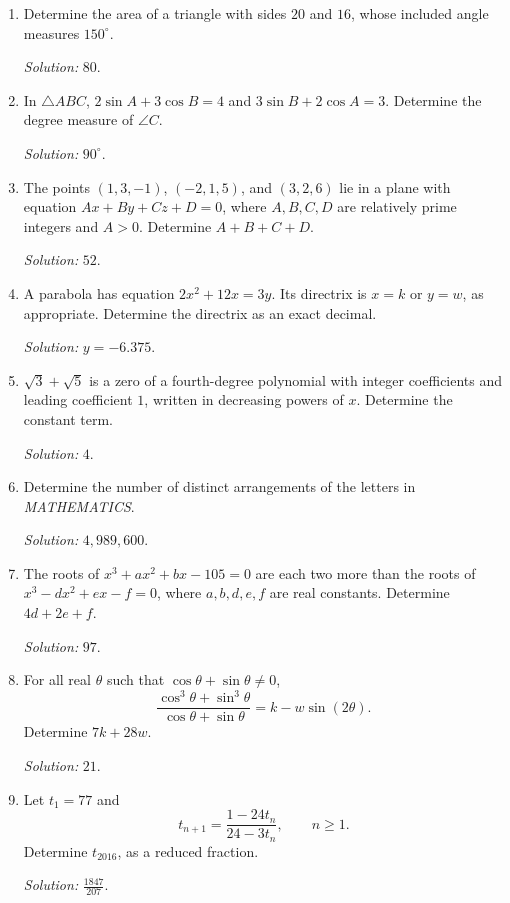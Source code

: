 \documentclass[11pt]{article}
\begin{document}
\begin{enumerate}[label=\textbf{\arabic*.}]
\item Determine the area of a triangle with sides $20$ and $16$, whose included angle measures $150^\circ$.\par\textit{Solution: }$80$.

\item In $\triangle ABC$, $2\sin A+3\cos B=4$ and $3\sin B+2\cos A=3$. Determine the degree measure of $\angle C$.\par\textit{Solution: }$90^\circ$.

\item The points $(1,3,-1)$, $(-2,1,5)$, and $(3,2,6)$ lie in a plane with equation $Ax+By+Cz+D=0$, where $A,B,C,D$ are relatively prime integers and $A>0$. Determine $A+B+C+D$.\par\textit{Solution: }$52$.

\item A parabola has equation $2x^2+12x=3y$. Its directrix is $x=k$ or $y=w$, as appropriate. Determine the directrix as an exact decimal.\par\textit{Solution: }$y=-6.375$.

\item $\sqrt3+\sqrt5$ is a zero of a fourth-degree polynomial with integer coefficients and leading coefficient $1$, written in decreasing powers of $x$. Determine the constant term.\par\textit{Solution: }$4$.

\item Determine the number of distinct arrangements of the letters in \emph{MATHEMATICS}.\par\textit{Solution: }$4{,}989{,}600$.

\item The roots of $x^3+ax^2+bx-105=0$ are each two more than the roots of $x^3-dx^2+ex-f=0$, where $a,b,d,e,f$ are real constants. Determine $4d+2e+f$.\par\textit{Solution: }$97$.

\item For all real $\theta$ such that $\cos\theta+\sin\theta\ne0$,
\[
\frac{\cos^3\theta+\sin^3\theta}{\cos\theta+\sin\theta}=k-w\sin(2\theta).
\]
Determine $7k+28w$.\par\textit{Solution: }$21$.

\item Let $t_1=77$ and
\[
t_{n+1}=\frac{1-24t_n}{24-3t_n},\qquad n\ge1.
\]
Determine $t_{2016}$, as a reduced fraction.\par\textit{Solution: }$\frac{1847}{207}$.


\end{enumerate}
\end{document}
